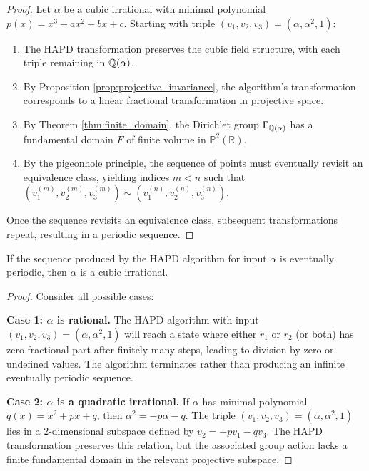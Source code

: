 \begin{proof}
Let $\alpha$ be a cubic irrational with minimal polynomial $p(x) = x^3 + ax^2 + bx + c$. Starting with triple $(v_1, v_2, v_3) = (\alpha, \alpha^2, 1)$:

\begin{enumerate}
    \item The HAPD transformation preserves the cubic field structure, with each triple remaining in $\mathbb{Q}(\alpha)$.
    
    \item By Proposition \ref{prop:projective_invariance}, the algorithm's transformation corresponds to a linear fractional transformation in projective space.
    
    \item By Theorem \ref{thm:finite_domain}, the Dirichlet group $\Gamma_{\mathbb{Q}(\alpha)}$ has a fundamental domain $F$ of finite volume in $\mathbb{P}^2(\mathbb{R})$.
    
    \item By the pigeonhole principle, the sequence of points must eventually revisit an equivalence class, yielding indices $m < n$ such that $(v_1^{(m)}, v_2^{(m)}, v_3^{(m)}) \sim (v_1^{(n)}, v_2^{(n)}, v_3^{(n)})$.
\end{enumerate}

Once the sequence revisits an equivalence class, subsequent transformations repeat, resulting in a periodic sequence.
\end{proof}

\begin{theorem}\label{thm:only_cubic_periodic}
If the sequence produced by the HAPD algorithm for input $\alpha$ is eventually periodic, then $\alpha$ is a cubic irrational.
\end{theorem}

\begin{proof}
Consider all possible cases:

\textbf{Case 1: $\alpha$ is rational.} The HAPD algorithm with input $(v_1, v_2, v_3) = (\alpha, \alpha^2, 1)$ will reach a state where either $r_1$ or $r_2$ (or both) has zero fractional part after finitely many steps, leading to division by zero or undefined values. The algorithm terminates rather than producing an infinite eventually periodic sequence.

\textbf{Case 2: $\alpha$ is a quadratic irrational.} If $\alpha$ has minimal polynomial $q(x) = x^2 + px + q$, then $\alpha^2 = -p\alpha - q$. The triple $(v_1, v_2, v_3) = (\alpha, \alpha^2, 1)$ lies in a 2-dimensional subspace defined by $v_2 = -pv_1 - qv_3$. The HAPD transformation preserves this relation, but the associated group action lacks a finite fundamental domain in the relevant projective subspace.
\end{proof}
